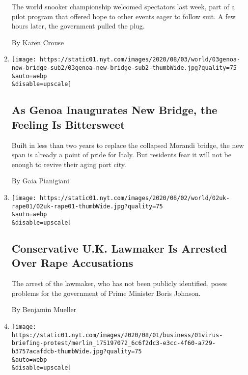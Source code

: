 \begin{enumerate}
  The world snooker championship welcomed spectators last week, part of
  a pilot program that offered hope to other events eager to follow
  suit. A few hours later, the government pulled the plug.

  By Karen Crouse
\item
  \href{/2020/08/02/world/europe/genoa-Morandi-bridge-replacement.html}{}

  \texttt{[image: https://static01.nyt.com/images/2020/08/03/world/03genoa-new-bridge-sub2/03genoa-new-bridge-sub2-thumbWide.jpg?quality=75\\\&auto=webp\\\&disable=upscale]}

  \hypertarget{as-genoa-inaugurates-new-bridge-the-feeling-is-bittersweet}{%
  \subsection{As Genoa Inaugurates New Bridge, the Feeling Is
  Bittersweet}\label{as-genoa-inaugurates-new-bridge-the-feeling-is-bittersweet}}

  Built in less than two years to replace the collapsed Morandi bridge,
  the new span is already a point of pride for Italy. But residents fear
  it will not be enough to revive their aging port city.

  By Gaia Pianigiani
\item
  \href{/2020/08/02/world/europe/uk-conservative-lawmaker-arrest.html}{}

  \texttt{[image: https://static01.nyt.com/images/2020/08/02/world/02uk-rape01/02uk-rape01-thumbWide.jpg?quality=75\\\&auto=webp\\\&disable=upscale]}

  \hypertarget{conservative-uk-lawmaker-is-arrested-over-rape-accusations}{%
  \subsection{Conservative U.K. Lawmaker Is Arrested Over Rape
  Accusations}\label{conservative-uk-lawmaker-is-arrested-over-rape-accusations}}

  The arrest of the lawmaker, who has not been publicly identified,
  poses problems for the government of Prime Minister Boris Johnson.

  By Benjamin Mueller
\item
  \href{/video/world/europe/100000007268465/coronavirus-protest-germany.html}{}

  \texttt{[image: https://static01.nyt.com/images/2020/08/01/business/01virus-briefing-protest/merlin\_175197072\_6c6f2dc3-e3cc-4f60-a729-b3757acafdcb-thumbWide.jpg?quality=75\\\&auto=webp\\\&disable=upscale]}


\end{enumerate}
